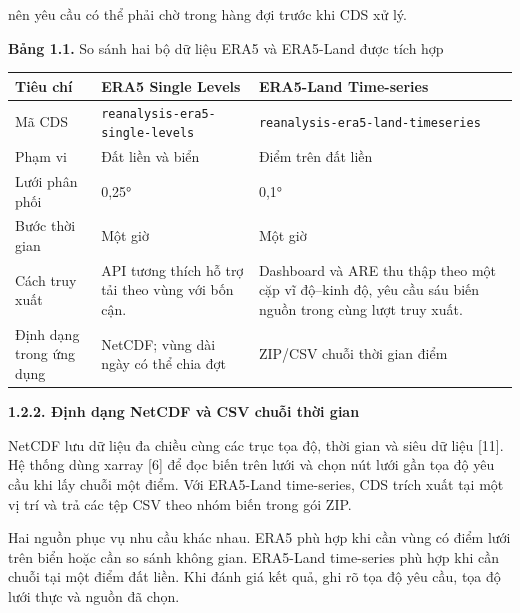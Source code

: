 \documentclass[12pt,a4paper]{article}
\newcommand{\orig}[1]{}
\newcommand{\pg}[1]{\newpage\pagenumbering{arabic}\setcounter{page}{#1}\thispagestyle{fancy}}
\newcommand{\heading}[1]{\par\medskip\noindent\textbf{#1}\par\nopagebreak}
\newcommand{\code}[1]{\texttt{#1}}
\newcommand{\captext}[1]{\begin{center}\small #1\end{center}}
\begin{document}
\orig{17}
\pg{7}
\noindent nên yêu cầu có thể phải chờ trong hàng đợi trước khi CDS xử lý.
\captext{\textbf{Bảng 1.1.} So sánh hai bộ dữ liệu ERA5 và ERA5-Land được tích hợp}
\small
\begin{tabularx}{\linewidth}{@{}p{.23\linewidth}XX@{}}
\toprule Tiêu chí & ERA5 Single Levels & ERA5-Land Time-series\\\midrule

Mã CDS & \code{reanalysis-era5-single-levels} & \code{reanalysis-era5-land-timeseries}\\
Phạm vi & Đất liền và biển & Điểm trên đất liền\\
Lưới phân phối & 0,25° & 0,1°\\
Bước thời gian & Một giờ & Một giờ\\
Cách truy xuất & API tương thích hỗ trợ tải theo vùng với bốn cận. & Dashboard và ARE thu thập theo một cặp vĩ độ–kinh độ, yêu cầu sáu biến nguồn trong cùng lượt truy xuất.\\
Định dạng trong ứng dụng & NetCDF; vùng dài ngày có thể chia đợt & ZIP/CSV chuỗi thời gian điểm\\
\bottomrule
\end{tabularx}
\normalsize
\heading{1.2.2. Định dạng NetCDF và CSV chuỗi thời gian}
NetCDF lưu dữ liệu đa chiều cùng các trục tọa độ, thời gian và siêu dữ liệu [11]. Hệ thống dùng xarray [6] để đọc biến trên lưới và chọn nút lưới gần tọa độ yêu cầu khi lấy chuỗi một điểm. Với ERA5-Land time-series, CDS trích xuất tại một vị trí và trả các tệp CSV theo nhóm biến trong gói ZIP.
 
Hai nguồn phục vụ nhu cầu khác nhau. ERA5 phù hợp khi cần vùng có điểm lưới trên biển hoặc cần so sánh không gian. ERA5-Land time-series phù hợp khi cần chuỗi tại một điểm đất liền. Khi đánh giá kết quả, ghi rõ tọa độ yêu cầu, tọa độ lưới thực và nguồn đã chọn.
\end{document}
